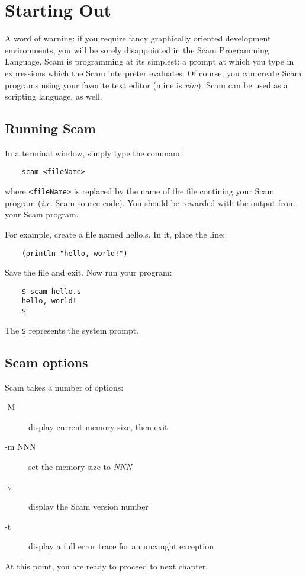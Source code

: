 \chapter{Starting Out}
\label{StartingOut}

A word of warning: if you require fancy graphically oriented development
environments, you will be sorely disappointed in the Scam Programming
Language. Scam is programming at its simplest: a prompt at which you type
in expressions which the Scam interpreter evaluates. Of course, you can
create Scam programs using your favorite text editor (mine is {\it vim}).
Scam can be used as a scripting language, as well.

\section{Running Scam}

In a terminal window, simply type the command:

\begin{verbatim}
    scam <fileName>
\end{verbatim}

where \verb!<fileName>! is replaced by the name of the file contining your
Scam program ({\it i.e.} Scam source code).
You should be rewarded with the output from your Scam program.

For example, create a file named hello.s. In it, place the line:

\begin{verbatim}
    (println "hello, world!")
\end{verbatim}

Save the file and exit. Now run your program:

\begin{verbatim}
    $ scam hello.s
    hello, world!
    $
\end{verbatim}

The \verb!$! represents the system prompt.

\section{Scam options}

Scam takes a number of options:

\begin{description}
\item[-M]
    
    display current memory size, then exit
    
\item[-m NNN]
    
    set the memory size to {\it NNN}
    
\item[-v]

    display the Scam version number

\item[-t]

    display a full error trace for an uncaught exception

\end{description}

At this point, you are ready to proceed to next chapter.
